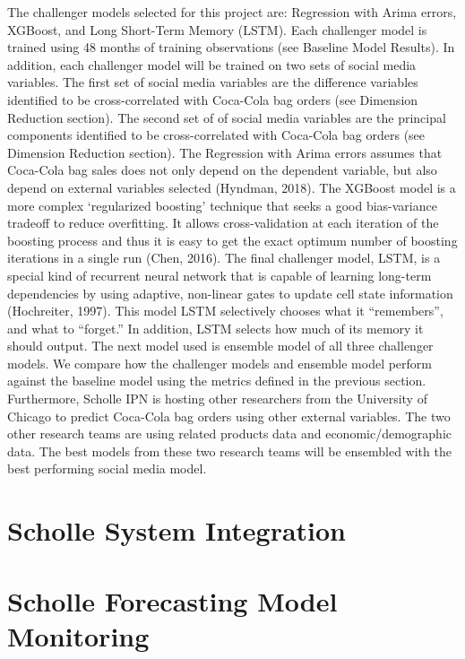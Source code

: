 \documentclass[12pt,oneside]{chicagocapstone}
\begin{document}
The challenger models selected for this project are: Regression with Arima errors, XGBoost, and Long Short-Term Memory (LSTM). Each challenger model is trained using 48 months of training observations (see Baseline Model Results). In addition, each challenger model will be trained on two sets of social media variables. The first set of social media variables are the difference variables identified to be cross-correlated with Coca-Cola bag orders (see Dimension Reduction section). The second set of of social media variables are the principal components identified to be cross-correlated with Coca-Cola bag orders (see Dimension Reduction section). The Regression with Arima errors assumes that Coca-Cola bag sales does not only depend on the dependent variable, but also depend on external variables selected (Hyndman, 2018). The XGBoost model is a more complex `regularized boosting' technique that seeks a good bias-variance tradeoff to reduce overfitting. It allows cross-validation at each iteration of the boosting process and thus it is easy to get the exact optimum number of boosting iterations in a single run (Chen, 2016). The final challenger model, LSTM, is a special kind of recurrent neural network that is capable of learning long-term dependencies by using adaptive, non-linear gates to update cell state information (Hochreiter, 1997). This model LSTM selectively chooses what it ``remembers'', and what to ``forget.'' In addition, LSTM selects how much of its memory it should output.
The next model used is ensemble model of all three challenger models. We compare how the challenger models and ensemble model perform against the baseline model using the metrics defined in the previous section. Furthermore, Scholle IPN is hosting other researchers from the University of Chicago to predict Coca-Cola bag orders using other external variables. The two other research teams are using related products data and economic/demographic data. The best models from these two research teams will be ensembled with the best performing social media model.

\hypertarget{scholle-system-integration}{%
\section*{Scholle System Integration}\label{scholle-system-integration}}

\hypertarget{scholle-forecasting-model-monitoring}{%
\section*{Scholle Forecasting Model Monitoring}\label{scholle-forecasting-model-monitoring}}
\end{document}

